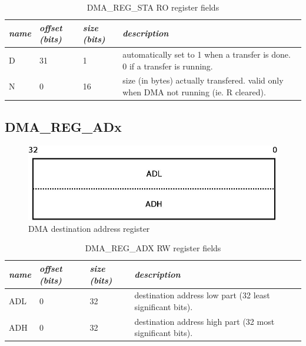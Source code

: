 \documentclass[a4paper, 11pt]{article}
\begin{document}
\begin{table}[!h]
\centering
\begin{scriptsize}
\begin{tabular}{|p{1cm}|p{1.5cm}|p{1.5cm}|p{10cm}|}
  \hline
  \textit{name} & \textit{offset (bits)} & \textit{size (bits)} & \textit{description} \\
  \hline
  D
  &
  31
  &
  1
  &
  automatically set to 1 when a transfer is done. 0 if a transfer is running.\\
  \hline
  N
  &
  0
  &
  16
  &
  size (in bytes) actually transfered. valid only when DMA not running (ie. R cleared). \\
  \hline
\end{tabular}
\end{scriptsize}
\caption{\tiny{DMA\_REG\_STA RO register fields}}
\label{tab:dma_reg_sta_fields}
\end{table}

\newpage
\subsection{DMA\_REG\_ADx}

\begin{figure}[!h]
\begin{center}
\includegraphics[scale=0.20]{../pic/dma_reg_adx/main.jpeg}
\end{center}
\caption{\tiny{DMA destination address register}}
\label{dma_reg_adx}
\end{figure}

\begin{table}[!h]
\centering
\begin{scriptsize}
\begin{tabular}{|p{1cm}|p{1.5cm}|p{1.5cm}|p{10cm}|}
  \hline
  \textit{name} & \textit{offset (bits)} & \textit{size (bits)} & \textit{description} \\
  \hline
  ADL
  &
  0
  &
  32
  &
  destination address low part (32 least significant bits). \\
  \hline
  ADH
  &
  0
  &
  32
  &
  destination address high part (32 most significant bits). \\
  \hline
\end{tabular}
\end{scriptsize}
\caption{\tiny{DMA\_REG\_ADX RW register fields}}
\label{tab:dma_reg_adx_fields}
\end{table}
\end{document}
